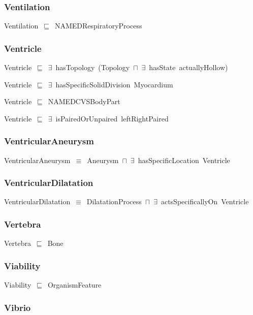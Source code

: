 \documentclass{article}
\begin{document}
\subsubsection*{Ventilation}

Ventilation~\ensuremath{\sqsubseteq}~NAMEDRespiratoryProcess~

\subsubsection*{Ventricle}

Ventricle~\ensuremath{\sqsubseteq}~\ensuremath{\exists}~hasTopology~(Topology~\ensuremath{\sqcap}~\ensuremath{\exists}~hasState~actuallyHollow)~

Ventricle~\ensuremath{\sqsubseteq}~\ensuremath{\exists}~hasSpecificSolidDivision~Myocardium~

Ventricle~\ensuremath{\sqsubseteq}~NAMEDCVSBodyPart~

Ventricle~\ensuremath{\sqsubseteq}~\ensuremath{\exists}~isPairedOrUnpaired~leftRightPaired~

\subsubsection*{VentricularAneurysm}

VentricularAneurysm~\ensuremath{\equiv}~Aneurysm~\ensuremath{\sqcap}~\ensuremath{\exists}~hasSpecificLocation~Ventricle

\subsubsection*{VentricularDilatation}

VentricularDilatation~\ensuremath{\equiv}~DilatationProcess~\ensuremath{\sqcap}~\ensuremath{\exists}~actsSpecificallyOn~Ventricle

\subsubsection*{Vertebra}

Vertebra~\ensuremath{\sqsubseteq}~Bone~

\subsubsection*{Viability}

Viability~\ensuremath{\sqsubseteq}~OrganismFeature~

\subsubsection*{Vibrio}
\end{document}
